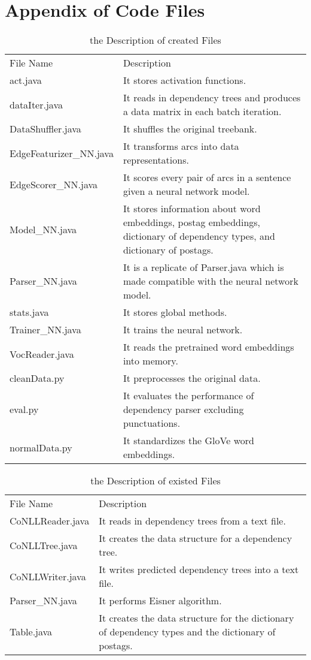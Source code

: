 \appendix
\chapter{Appendix of Code Files}
\begin{table}[h]
\centering
    \begin{tabular}{@{}p{4cm} p{11cm} @{}} \toprule
  	File Name& Description\\ 
  	act.java&It stores activation functions.\\ 
  	dataIter.java&It reads in dependency trees and produces a data matrix in each batch iteration.\\ 
  	DataShuffler.java&It shuffles the original treebank.\\ 
  	EdgeFeaturizer\_NN.java&It transforms arcs into data representations.\\  
  	EdgeScorer\_NN.java&It scores every pair of arcs in a sentence given a neural network model.\\ 
  	Model\_NN.java&It stores information about word embeddings, postag embeddings, dictionary of dependency types, and dictionary of postags.\\ 
  	Parser\_NN.java&It is a replicate of Parser.java which is made compatible with the neural network model.\\ 
  	stats.java&It stores global methods.\\ 
  	Trainer\_NN.java&It trains the neural network.\\ 
  	VocReader.java&It reads the pretrained word embeddings into memory.\\ 
  	cleanData.py &It preprocesses the original data.\\
  	eval.py&It evaluates the performance of dependency parser excluding punctuations.\\
  	normalData.py& It standardizes the GloVe word embeddings.\\
  	\bottomrule 
    \end{tabular}
\caption{the Description of created Files}
\end{table}
\begin{table}[h]
\centering
    \begin{tabular}{@{}p{4cm} p{11cm} @{}} \toprule
  	File Name& Description\\ 
 	CoNLLReader.java& It reads in dependency trees from a text file.\\
 	CoNLLTree.java& It creates the data structure for a dependency tree.\\
 	CoNLLWriter.java& It writes predicted dependency trees into a text file.\\
 	Parser\_NN.java& It performs Eisner algorithm.\\
 	Table.java& It creates the data structure for the dictionary of dependency types and the dictionary of postags.\\
 	\bottomrule 
    \end{tabular}  
\caption{the Description of existed Files}
\end{table}

